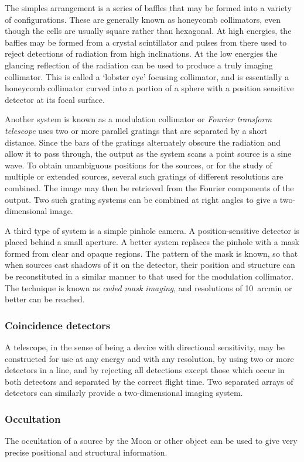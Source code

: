 The simples arrangement is a series of baffles that may be formed into a variety of configurations. These are generally known as honeycomb collimators, even though the cells are
usually square rather than hexagonal. At high energies, the baffles may be formed from 
a crystal scintillator and pulses from there used to reject detections of radiation from
high inclinations. At the low energies the glancing reflection of the radiation can be used
to produce a truly imaging collimator. This is called a `lobster eye' focusing collimator, 
and is essentially a honeycomb collimator curved into a portion of a sphere with a position 
sensitive detector at its focal surface. 

Another system is known as a modulation collimator
or {\it Fourier transform telescope} uses two or more parallel gratings that are separated by
a short distance. Since the bars of the gratings alternately obscure the radiation and allow it to 
pass through, the output as the system scans a point source is a sine wave. To obtain 
unambiguous positions for the sources, or for the study of multiple or extended sources, 
several such gratings of different resolutions are combined. The image may then be 
retrieved from the Fourier components of the output. Two such grating systems can be
combined at right angles to give a two-dimensional image. 

A third type of system is a simple pinhole camera. A position-sensitive detector is placed 
behind a small aperture. A better system replaces the pinhole with a mask formed from 
clear and opaque regions. The pattern of the mask is known, so that when sources cast 
shadows of it on the detector, their position and structure can be reconstituted in a similar
manner to that used for the modulation collimator. The technique is known as {\it coded 
mask imaging}, and resolutions of 10~arcmin or better can be reached. 

\subsubsection{Coincidence detectors}
A telescope, in the sense of being a device with directional sensitivity, may be constructed for use at any energy and with any resolution, by using two
or more detectors in a line, and by rejecting all detections except those which occur in 
both detectors and separated by the correct flight time. Two separated arrays of detectors 
can similarly provide a two-dimensional imaging system.

\subsubsection{Occultation}
The occultation of a source by the Moon or other object can be used to 
give very precise positional and structural information.

